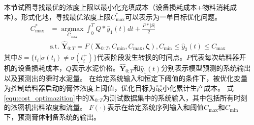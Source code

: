 本节试图寻找最优的浓度上限以最小化充填成本（设备损耗成本+物料消耗成本）。形式化地，寻找最优浓度上限$C_{\max}^{*}$可以表示为一单目标优化问题。
\begin{equation}
    \begin{aligned}
       C^*_{\max}&=\mathop{\arg\max}\limits_{C_{\max}} \int_{0}^{T} Q*\hat{y}_{1}(t) dt + \frac{P*|S|}{2}\\
       &\text{s.t. } \hat{\boldsymbol{Y}}_{0: T}=F\left(\boldsymbol{X}_{0: T},C_{\min}, C_{\max},\boldsymbol{\zeta}\right),
       C_{\min}\leq \hat{y}_{3}(t) \leq C_{\max}
    \end{aligned}
    \label{equ:cost_optimazition}
    \end{equation}
其中$S=\{t_i|\sigma (t_i)\neq \sigma (t^+_i)\}$代表阶段发生转换的时间点。$P$代表每次给料器开机的设备损耗成本，$Q$表示水泥价格。$\hat{\boldsymbol{Y}}_{0: T}$和$\hat{y}_{1}(t)$分别表示模型预测的系统输出以及预测出的瞬时水泥量。
在给定系统输入和恒定下阈值的条件下，被优化变量为控制给料器启动的膏体浓度上阈值，优化目标为最小化累计生产成本。
式\eqref{equ:cost_optimazition}中的$\boldsymbol{X}_{0: T}$为测试数据集中的系统输入，其中包括所有时刻的浓密机出料浓度和流量。
$F(\cdot)$表示在给定系统序列输入和阈值$C_{\max}$和$C_{\min}$下，预测膏体制备系统的输出。

